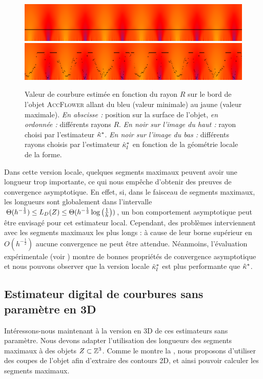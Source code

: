 \begin{figure}[ht]{
  \begin{center}
    \includegraphics[width=.95\linewidth]{images/Curvature/ScaleSpace_Flower_Global}
    \includegraphics[width=.95\linewidth]{images/Curvature/ScaleSpace_Flower_Local}
  \end{center}}
  \caption{Valeur de courbure estimée en fonction du rayon $R$ sur le bord de
  l'objet \textsc{AccFlower} allant du bleu (valeur minimale) au jaune (valeur
  maximale). \emph{En abscisse :} position sur la surface de l'objet, \emph{en
  ordonnée :} différents rayons $R$. \emph{En noir sur l'image du haut :} rayon
  choisi par l'estimateur $\hat{\kappa}^{*}$. \emph{En noir sur l'image du bas :}
  différents rayons choisis par l'estimateur $\hat{\kappa}^{*}_{l}$ en fonction de la
  géométrie locale de la forme.
  \label{fig:curvature-pf-radii}}
\end{figure}

Dans cette version locale, quelques segments maximaux peuvent avoir une longueur
trop importante, ce qui nous empêche d'obtenir des preuves de convergence
asymptotique. En effet, si, dans le faisceau de segments maximaux, les longueurs
sont globalement dans l'intervalle $\Theta(h^{-\frac{1}{3}}) \le L_D(
{Z} ) \le \Theta(h^{-\frac{1}{3}} \log \left(\frac{1}{h}\right))$, un
bon comportement asymptotique peut être envisagé pour cet estimateur local.
Cependant, des problèmes interviennent avec les segments maximaux les plus longs : à
cause de leur borne supérieur en $O(h^{-\frac{1}{2}})$ aucune convergence ne peut
être attendue. Néanmoins, l'évaluation expérimentale (voir
) montre de bonnes propriétés de
convergence asymptotique et nous pouvons observer que la version locale
$\hat{\kappa}^{*}_{l}$ est plus performante que $\hat{\kappa}^{*}$.
%
\subsection{Estimateur digital de courbures sans paramètre en 3D}
%
Intéressons-nous maintenant à la version en 3D de ces estimateurs sans paramètre.
Nous devons adapter l'utilisation des longueurs des segments maximaux à des
objets $Z \subset \mathbb{Z}^3$. Comme le montre la
, nous proposons d'utiliser des coupes de
l’objet afin d'extraire des contours 2D, et ainsi pouvoir calculer les segments
maximaux.

